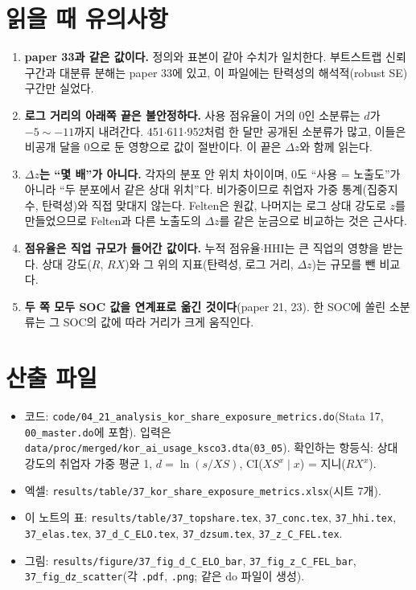 \documentclass[11pt]{article}
\begin{document}
\section{읽을 때 유의사항}

\begin{enumerate}[leftmargin=*]
  \item \textbf{paper 33과 같은 값이다.} 정의와 표본이 같아 수치가 일치한다. 부트스트랩 신뢰구간과 대분류 분해는 paper 33에 있고, 이 파일에는 탄력성의 해석적(robust SE) 구간만 실었다.
  \item \textbf{로그 거리의 아래쪽 끝은 불안정하다.} 사용 점유율이 거의 0인 소분류는 $d$가 $-5\sim-11$까지 내려간다. 451$\cdot$611$\cdot$952처럼 한 달만 공개된 소분류가 많고, 이들은 비공개 달을 0으로 둔 영향으로 값이 절반이다. 이 끝은 $\Delta z$와 함께 읽는다.
  \item \textbf{$\Delta z$는 ``몇 배''가 아니다.} 각자의 분포 안 위치 차이이며, 0도 ``사용 = 노출도''가 아니라 ``두 분포에서 같은 상대 위치''다. 비가중이므로 취업자 가중 통계(집중지수, 탄력성)와 직접 맞대지 않는다. Felten은 원값, 나머지는 로그 상대 강도로 $z$를 만들었으므로 Felten과 다른 노출도의 $\Delta z$를 같은 눈금으로 비교하는 것은 근사다.
  \item \textbf{점유율은 직업 규모가 들어간 값이다.} 누적 점유율$\cdot$HHI는 큰 직업의 영향을 받는다. 상대 강도($R$, $RX$)와 그 위의 지표(탄력성, 로그 거리, $\Delta z$)는 규모를 뺀 비교다.
  \item \textbf{두 쪽 모두 SOC 값을 연계표로 옮긴 것이다}(paper 21, 23). 한 SOC에 쏠린 소분류는 그 SOC의 값에 따라 거리가 크게 움직인다.
\end{enumerate}

\section{산출 파일}

\begin{itemize}[leftmargin=*]
  \item 코드: \texttt{code/04\_21\_analysis\_kor\_share\_exposure\_metrics.do}(Stata 17, \texttt{00\_master.do}에 포함). 입력은 \texttt{data/proc/merged/kor\_ai\_usage\_ksco3.dta}(\texttt{03\_05}). 확인하는 항등식: 상대 강도의 취업자 가중 평균 1, $d = \ln(s / XS)$, CI($XS^x \mid x$) = 지니($RX^x$).
  \item 엑셀: \texttt{results/table/37\_kor\_share\_exposure\_metrics.xlsx}(시트 7개).
  \item 이 노트의 표: \texttt{results/table/37\_topshare.tex}, \texttt{37\_conc.tex}, \texttt{37\_hhi.tex}, \texttt{37\_elas.tex}, \texttt{37\_d\_C\_ELO.tex}, \texttt{37\_dzsum.tex}, \texttt{37\_z\_C\_FEL.tex}.
  \item 그림: \texttt{results/figure/37\_fig\_d\_C\_ELO\_bar}, \texttt{37\_fig\_z\_C\_FEL\_bar}, \texttt{37\_fig\_dz\_scatter}(각 \texttt{.pdf}, \texttt{.png}; 같은 do 파일이 생성).
\end{itemize}

\printbibliography[title={참고문헌}]
\end{document}
